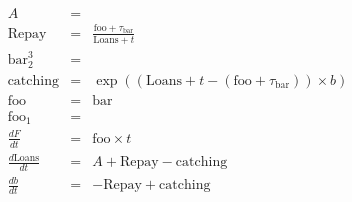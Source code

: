 \documentclass{article}
\begin{document}
\begin{eqnarray*}
A&=&\\
\mathrm{Repay}&=&\frac{\mathrm{foo}+\tau_{\mathrm{bar}}}{\mathrm{Loans}+ t }\\
\mathrm{bar}_2^3&=&\\
\mathrm{catching}&=&\exp\left(\left(\mathrm{Loans}+ t -\left(\mathrm{foo}+\tau_{\mathrm{bar}}\right)\right)\times b\right)\\
\mathrm{foo}&=&\mathrm{bar}\\
\mathrm{foo}_1&=&\\
\frac{ d F}{dt} &=&\mathrm{foo}\times  t \\
\frac{ d \mathrm{Loans}}{dt} &=&A+\mathrm{Repay}-\mathrm{catching}\\
\frac{ d b}{dt} &=&-\mathrm{Repay}+\mathrm{catching}\\
\end{eqnarray*}
\end{document}
